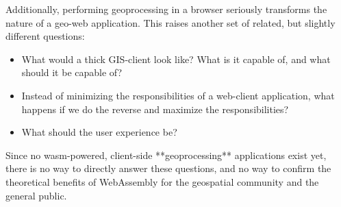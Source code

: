 Additionally, performing geoprocessing in a browser seriously transforms the nature of a geo-web application. This raises another set of related, but slightly different questions:

\begin{itemize}
  \item What would a thick GIS-client look like? What is it capable of, and what should it be capable of?
  \item Instead of minimizing the responsibilities of a web-client application, what happens if we do the reverse and maximize the responsibilities? 
  
  \item What should the user experience be?
\end{itemize}


Since no wasm-powered, client-side **geoprocessing** applications exist yet, there is no way to directly answer these questions, and no way to confirm the theoretical benefits of WebAssembly for the geospatial community and the general public.